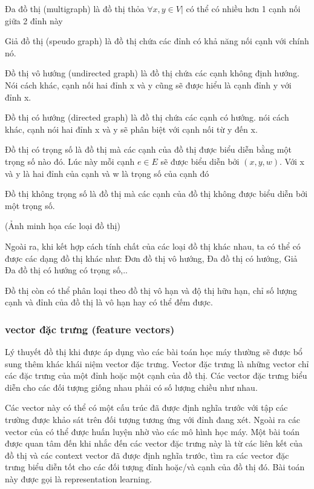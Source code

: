 Đa đồ thị (multigraph) là đồ thị thỏa $\forall x,y \in V | $ có thể có nhiều hơn 1 cạnh nối giữa 2 đỉnh này 

Giả đồ thị (speudo graph) là đồ thị chứa các đỉnh có khả năng nối cạnh với chính nó.

Đồ thị vô hướng (undirected graph) là đồ thị chứa các cạnh không định hướng. Nói cách khác, cạnh nối hai đỉnh x và y cũng sẽ được hiểu là cạnh đỉnh y với đỉnh x.

Đồ thị có hướng (directed graph) là đồ thị chứa các cạnh có hướng. nói cách khác, cạnh nói hai đỉnh x và y sẽ phân biệt với cạnh nối từ y đến x.

Đồ thị có trọng số là đồ thị mà các cạnh của đồ thị được biểu diễn bằng một trọng số nào đó. Lúc này mỗi cạnh $e \in E$ sẽ được biểu diễn bởi $(x, y, w)$. Với x và y là hai đỉnh của cạnh và w là trọng số của cạnh đó

Đồ thị không trọng số là đồ thị mà các cạnh của đồ thị không được biểu diễn bởi một trọng số.

(Ảnh minh họa các loại đồ thị)

Ngoài ra, khi kết hợp cách tính chất của các loại đồ thị khác nhau, ta có thể có được các dạng đồ thị khác như: Đơn đồ thị vô hướng, Đa đồ thị có hướng, Giả Đa đồ thị có hướng có trọng số,..

Đồ thị còn có thể phân loại theo đồ thị vô hạn và độ thị hữu hạn, chỉ số lượng cạnh và đỉnh của đồ thị là vô hạn hay có thể đếm được.

\subsubsection{vector đặc trưng (feature vectors)}

Lý thuyết đồ thị khi được áp dụng vào các bài toán học máy thường sẽ được bổ sung thêm khác khái niệm vector đặc trưng. Vector đặc trưng là những vector chỉ các đặc trưng của một đỉnh hoặc một cạnh của đồ thị. Các vector đặc trưng biểu diễn cho các đối tượng giống nhau phải có số lượng chiều như nhau.

Các vector này có thể có một cấu trúc đã được định nghĩa trước với tập các trường được khảo sát trên đối tượng tương ứng với đỉnh đang xét. Ngoài ra các vector của có thể được huấn luyện nhờ vào các mô hình học máy. Một bài toán được quan tâm đến khi nhắc đến các vector đặc trưng này là từ các liên kết của đồ thị và các context vector đã được định nghĩa trước, tìm ra các vector đặc trưng biểu diễn tốt cho các đối tượng đỉnh hoặc/và cạnh của đồ thị đó. Bài toán này được gọi là representation learning.

